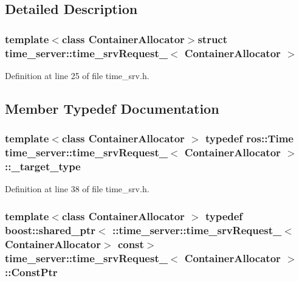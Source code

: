 \subsection{\-Detailed \-Description}
\subsubsection*{template$<$class Container\-Allocator$>$struct time\-\_\-server\-::time\-\_\-srv\-Request\-\_\-$<$ Container\-Allocator $>$}



\-Definition at line 25 of file time\-\_\-srv.\-h.



\subsection{\-Member \-Typedef \-Documentation}
\subsubsection[{\-\_\-target\-\_\-type}]{\setlength{\rightskip}{0pt plus 5cm}template$<$class Container\-Allocator $>$ typedef ros\-::\-Time {\bf time\-\_\-server\-::time\-\_\-srv\-Request\-\_\-}$<$ \-Container\-Allocator $>$\-::{\bf \-\_\-target\-\_\-type}}\label{structtime__server_1_1time__srvRequest___a3bccf81a73102ad70b4feceb52bc3589}


\-Definition at line 38 of file time\-\_\-srv.\-h.

\subsubsection[{\-Const\-Ptr}]{\setlength{\rightskip}{0pt plus 5cm}template$<$class Container\-Allocator $>$ typedef boost\-::shared\-\_\-ptr$<$ \-::{\bf time\-\_\-server\-::time\-\_\-srv\-Request\-\_\-}$<$\-Container\-Allocator$>$ const$>$ {\bf time\-\_\-server\-::time\-\_\-srv\-Request\-\_\-}$<$ \-Container\-Allocator $>$\-::{\bf \-Const\-Ptr}}\label{structtime__server_1_1time__srvRequest___aac9bfafdd36a022a1af75e466bd8eec5}


